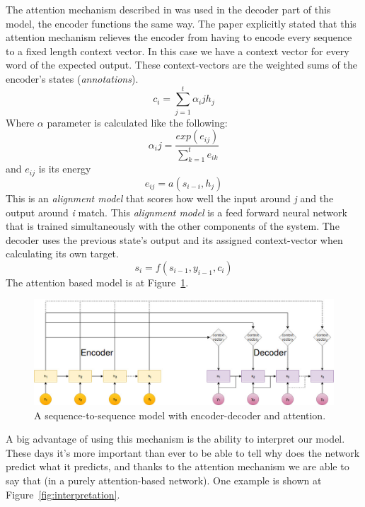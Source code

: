 The attention mechanism described in \cite{Bahdanau:2015} was used in the decoder part of this model, the encoder functions the same way. The paper explicitly stated that this attention mechanism relieves the encoder from having to encode every sequence to a fixed length context vector. In this case we have a context vector for every word of the expected output. These context-vectors are the weighted sums of the encoder's states (\textit{annotations}).
\[c_i = \sum_{j=1}^{t} \alpha_ij h_j\]
Where \(\alpha\) parameter is calculated like the following:
\[\alpha_ij = \frac{exp(e_{ij})}{\sum_{k=1}^{t} e_{ik}} \]
and \(e_{ij}\) is its energy
\[e_{ij} = a(s_{i-i}, h_j)\]
This is an \textit{alignment model} that scores how well the input around \textit{j} and the output around \textit{i} match. This \textit{alignment model} is a feed forward neural network that is trained simultaneously with the other components of the system.
The decoder uses the previous state's output and its assigned context-vector when calculating its own target.
\[s_i = f(s_{i-1}, y_{i-1}, c_i)\]
The attention based model is at Figure~\ref{fig:attention}.
\begin{figure}[!htb]
	\centering
	\includegraphics[scale=0.4]{attention.jpg}
	\caption{A sequence-to-sequence model with encoder-decoder and attention.}
	\label{fig:attention}
\end{figure}

A big advantage of using this mechanism is the ability to interpret our model. These days it's more important than ever to be able to tell why does the network predict what it predicts, and thanks to the attention mechanism we are able to say that (in a purely attention-based network). One example is shown at Figure~\ref{fig:interpretation}.

